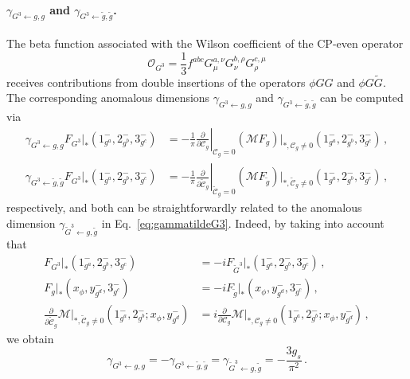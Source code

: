\paragraph{$\gamma_{G^3\leftarrow g, g}$ and $\gamma_{G^3\leftarrow \tilde g, \tilde g}$.}
\label{par:GGG}
The beta function associated with the Wilson coefficient of the CP-even operator
\begin{equation}
    \mathcal O_{G^3} = \frac{1}{3}f^{abc}G_\mu^{a, \nu} G_{\nu}^{b, \rho} G_{\rho}^{c, \mu}
\end{equation}
receives contributions from double insertions of the operators $\phi GG$ and $\phi G\tilde G$.
The corresponding anomalous dimensions $\gamma_{ G^3\leftarrow g, g}$ and $\gamma_{ G^3\leftarrow \tilde g,\tilde g}$ can be computed via
%
\begin{align}
    \gamma_{ G^3\leftarrow g, g}F_{ G^3}|_*(1^-_{g^a},2^-_{g^b},3^-_{g^c})&=-\frac{1}{\pi}\left. \frac{\partial}{\partial \mathcal C_g} \right|_{\mathcal C_g = 0} (\mathcal M F_{g})|_{*,\mathcal C_g \neq  0}(1^-_{g^a},2^-_{g^b},3^-_{g^c})\,, \\
    \gamma_{ G^3\leftarrow \tilde g,\tilde g}F_{ G^3}|_*(1^-_{g^a},2^-_{g^b},3^-_{g^c})&=-\frac{1}{\pi}\left. \frac{\partial}{\partial \mathcal{\tilde C}_g} \right|_{\mathcal{\tilde C}_g = 0} (\mathcal M F_{\tilde g})|_{*,\mathcal{\tilde C}_g \neq  0}(1^-_{g^a},2^-_{g^b},3^-_{g^c})\,,
\end{align}
respectively, and both can be straightforwardly related to the anomalous dimension $\gamma_{\tilde G^3\leftarrow g,\tilde g}$ in Eq.~\eqref{eq:gammatildeG3}.
Indeed, by taking into account that
\begin{align}
    F_{ G^3}|_*(1^-_{g^a},2^-_{g^b},3^-_{g^c}) &= -i F_{\tilde G^3}|_*(1^-_{g^a},2^-_{g^b},3^-_{g^c})\,, \\
    F_{g}|_*(x_\phi,y^-_{g^d},3^-_{g^c}) &=-i F_{\tilde g}|_*(x_\phi,y^-_{g^d},3^-_{g^c})\,,\\
    \frac{\partial}{\partial \mathcal{\tilde C}_g}\mathcal{M}|_{*,\mathcal{\tilde C}_g \neq  0}(1^-_{g^a},2^-_{g^b};x_\phi,y^-_{g^d})&= i \frac{\partial}{\partial \mathcal{C}_g} \mathcal{M}|_{*,\mathcal C_g \neq  0}(1^-_{g^a},2^-_{g^b};x_\phi,y^-_{g^d})\,,
\end{align}
we obtain
\begin{equation}
\label{eq:GGG_AD}
    \gamma_{ G^3\leftarrow g, g} =- \gamma_{ G^3\leftarrow \tilde g, \tilde g} = \gamma_{ \tilde G^3\leftarrow g, \tilde g} = -\frac{3g_s}{\pi^2}\,.
\end{equation}


